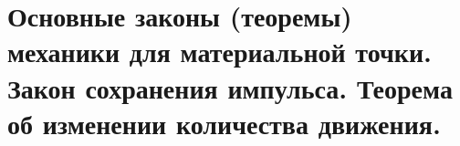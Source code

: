 \chapter{Основные законы (теоремы) механики для материальной точки. Закон
сохранения импульса. Теорема об изменении количества движения.}

\newpage %
